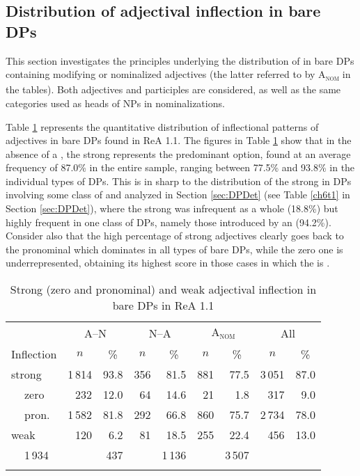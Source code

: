 \documentclass[output=paper,colorlinks,citecolor=brown]{langscibook}
\begin{document}
\subsection{Distribution of adjectival inflection in bare DPs}\label{sec:bareDP}
This section investigates the principles underlying the distribution of
 in bare DPs containing modifying or nominalized
adjectives (the latter referred to by A\textsubscript{\textsc{nom}} in the
tables). Both  adjectives and participles are considered, as
well as the same categories used as heads of NPs in nominalizations.

Table \ref{ch6t6} represents the quantitative distribution of inflectional
patterns of adjectives in bare DPs found in ReA 1.1. The figures in Table \ref{ch6t6} show that in the absence of a , the
strong  represents the predominant option, found at an average
frequency of 87.0\% in the entire sample, ranging between 77.5\% and
93.8\% in the individual types of DPs. This is in sharp  to the
distribution of the strong  in DPs involving some class of
 and analyzed in Section \ref{sec:DPDet} (see Table \ref{ch6t1} in Section \ref{sec:DPDet}), where
the strong  was infrequent as a whole (18.8\%) but highly
frequent in one class of DPs, namely those introduced by an 
 (94.2\%). Consider also that the high percentage of strong
adjectives clearly goes back to the pronominal  which
dominates in all types of bare DPs, while the zero one is
underrepresented, obtaining its highest score in those cases in which
the  is .

\begin{table}[t]
\begin{tabular}{ll *4{rr}}
\lsptoprule
&  & \multicolumn{2}{c}{A–N} & \multicolumn{2}{c}{N–A} & \multicolumn{2}{c}{A\textsubscript{\textsc{nom}}} & \multicolumn{2}{c}{All}\\
\cmidrule(lr){3-4}\cmidrule(lr){5-6}\cmidrule(lr){7-8}\cmidrule(lr){9-10}
\multicolumn{2}{l}{Inflection} & \multicolumn{1}{c}{$n$}   & \multicolumn{1}{c}{\%}     & \multicolumn{1}{c}{$n$}   & \multicolumn{1}{c}{\%}& \multicolumn{1}{c}{$n$}   & \multicolumn{1}{c}{\%}& \multicolumn{1}{c}{$n$}   & \multicolumn{1}{c}{\%}\\\midrule 
\multicolumn{2}{l}{strong}  & 1\,814 & 93.8 & 356 & 81.5 & 881 & 77.5 & 3\,051 & 87.0\\
& zero                      &   232 & 12.0 & 64  & 14.6 & 21  &  1.8 & 317   &  9.0\\
& pron.                     & 1\,582 & 81.8 & 292 & 66.8 & 860 & 75.7 & 2\,734 & 78.0\\
\multicolumn{2}{l}{weak}    &   120 &  6.2 &  81 & 18.5 & 255 & 22.4 & 456   & 13.0\\\addlinespace
\multicolumn{2}{l}{Total}   & 1\,934 &        & 437 &        & 1\,136  &     & 3\,507 &\\
\lspbottomrule
\end{tabular}
\caption{Strong (zero and pronominal) and weak adjectival inflection in
bare DPs in ReA 1.1}\label{ch6t6}
\end{table}
\end{document}
